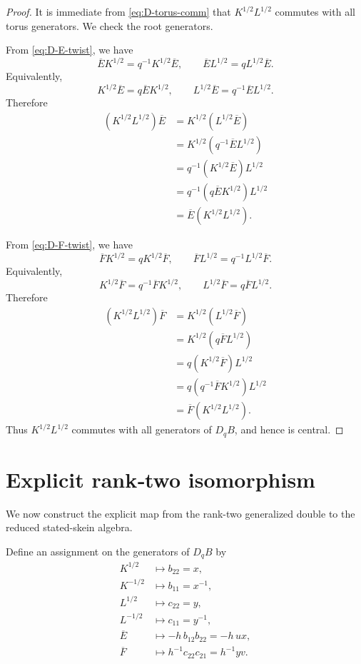 \documentclass[12pt]{article}
\theoremstyle{plain}
\theoremstyle{definition}
\numberwithin{equation}{section}
\newcommand{\DqB}{D_qB}
\newcommand{\Khalf}{K^{1/2}}
\newcommand{\Kmh}{K^{-1/2}}
\newcommand{\Lhalf}{L^{1/2}}
\newcommand{\Lmh}{L^{-1/2}}
\newcommand{\Ebar}{\overline{E}}
\newcommand{\Fbar}{\overline{F}}
\begin{document}
\begin{proof}
It is immediate from \eqref{eq:D-torus-comm} that \(\Khalf\Lhalf\) commutes with all torus generators.  We check the root generators.

From \eqref{eq:D-E-twist}, we have
\[
\Ebar\Khalf=q^{-1}\Khalf\Ebar,
\qquad
\Ebar\Lhalf=q\Lhalf\Ebar.
\]
Equivalently,
\[
\Khalf\Ebar=q\Ebar\Khalf,
\qquad
\Lhalf\Ebar=q^{-1}\Ebar\Lhalf.
\]
Therefore
\[
\begin{aligned}
(\Khalf\Lhalf)\Ebar
&=
\Khalf(\Lhalf\Ebar)\\
&=
\Khalf(q^{-1}\Ebar\Lhalf)\\
&=
q^{-1}(\Khalf\Ebar)\Lhalf\\
&=
q^{-1}(q\Ebar\Khalf)\Lhalf\\
&=
\Ebar(\Khalf\Lhalf).
\end{aligned}
\]

From \eqref{eq:D-F-twist}, we have
\[
\Fbar\Khalf=q\Khalf\Fbar,
\qquad
\Fbar\Lhalf=q^{-1}\Lhalf\Fbar.
\]
Equivalently,
\[
\Khalf\Fbar=q^{-1}\Fbar\Khalf,
\qquad
\Lhalf\Fbar=q\Fbar\Lhalf.
\]
Therefore
\[
\begin{aligned}
(\Khalf\Lhalf)\Fbar
&=
\Khalf(\Lhalf\Fbar)\\
&=
\Khalf(q\Fbar\Lhalf)\\
&=
q(\Khalf\Fbar)\Lhalf\\
&=
q(q^{-1}\Fbar\Khalf)\Lhalf\\
&=
\Fbar(\Khalf\Lhalf).
\end{aligned}
\]
Thus \(\Khalf\Lhalf\) commutes with all generators of \(\DqB\), and hence is central.
\end{proof}

\section{Explicit rank‑two isomorphism}
\label{sec:isomorphism}

We now construct the explicit map from the rank-two generalized double to the reduced stated-skein algebra.

Define an assignment on the generators of \(\DqB\) by
\begin{equation}\label{eq:Psi-def}
\begin{aligned}
\Khalf &\longmapsto b_{22}=x,\\
\Kmh &\longmapsto b_{11}=x^{-1},\\
\Lhalf &\longmapsto c_{22}=y,\\
\Lmh &\longmapsto c_{11}=y^{-1},\\
\Ebar &\longmapsto -h\,b_{12}b_{22}=-h\,u x,\\
\Fbar &\longmapsto h^{-1}c_{22}c_{21}=h^{-1}y v.
\end{aligned}
\end{equation}
\end{document}
